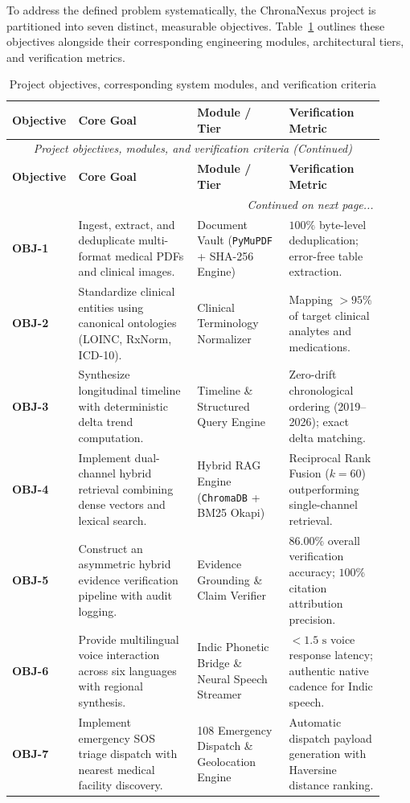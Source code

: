 To address the defined problem systematically, the ChronaNexus project is partitioned into seven distinct, measurable objectives. Table~\ref{tab:1_1_objectives} outlines these objectives alongside their corresponding engineering modules, architectural tiers, and verification metrics.

\small
\begin{longtable}{@{}p{0.12\linewidth} p{0.31\linewidth} p{0.24\linewidth} p{0.25\linewidth}@{}}
\caption{Project objectives, corresponding system modules, and verification criteria}\label{tab:1_1_objectives} \\
\toprule
\textbf{Objective} & \textbf{Core Goal} & \textbf{Module / Tier} & \textbf{Verification Metric} \\
\midrule
\endfirsthead
\toprule
\multicolumn{4}{c}{\small\textit{Project objectives, modules, and verification criteria (Continued)}} \\[4pt]
\midrule
\textbf{Objective} & \textbf{Core Goal} & \textbf{Module / Tier} & \textbf{Verification Metric} \\
\midrule
\endhead
\midrule
\multicolumn{4}{r}{\footnotesize\textit{Continued on next page...}} \\
\bottomrule
\endfoot
\bottomrule
\endlastfoot
\textbf{OBJ-1} & Ingest, extract, and deduplicate multi-format medical PDFs and clinical images. & Document Vault (\texttt{PyMuPDF} + SHA-256 Engine) & $100\%$ byte-level deduplication; error-free table extraction. \\
\textbf{OBJ-2} & Standardize clinical entities using canonical ontologies (LOINC, RxNorm, ICD-10). & Clinical Terminology Normalizer & Mapping $>95\%$ of target clinical analytes and medications. \\
\textbf{OBJ-3} & Synthesize longitudinal timeline with deterministic delta trend computation. & Timeline \& Structured Query Engine & Zero-drift chronological ordering (2019--2026); exact delta matching. \\
\textbf{OBJ-4} & Implement dual-channel hybrid retrieval combining dense vectors and lexical search. & Hybrid RAG Engine (\texttt{ChromaDB} + BM25 Okapi) & Reciprocal Rank Fusion ($k=60$) outperforming single-channel retrieval. \\
\textbf{OBJ-5} & Construct an asymmetric hybrid evidence verification pipeline with audit logging. & Evidence Grounding \& Claim Verifier & $86.00\%$ overall verification accuracy; $100\%$ citation attribution precision. \\
\textbf{OBJ-6} & Provide multilingual voice interaction across six languages with regional synthesis. & Indic Phonetic Bridge \& Neural Speech Streamer & $<1.5\text{ s}$ voice response latency; authentic native cadence for Indic speech. \\
\textbf{OBJ-7} & Implement emergency SOS triage dispatch with nearest medical facility discovery. & 108 Emergency Dispatch \& Geolocation Engine & Automatic dispatch payload generation with Haversine distance ranking. \\
\end{longtable}
\normalsize


